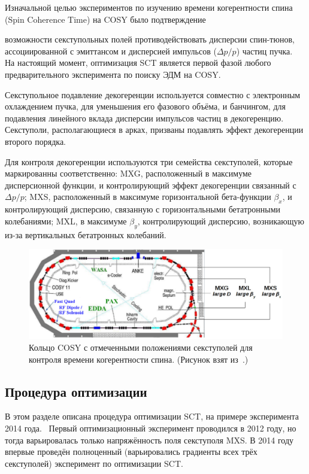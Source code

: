 \newcommand{\dpop}{\Delta p/p}

Изначальной целью экспериментов по изучению времени когерентности спина (Spin Coherence Time) на COSY было подтверждение

возможности секступольных полей противодействовать дисперсии спин-тюнов, ассоциированной с 
эмиттансом и дисперсией импульсов ($\dpop$) частиц пучка.~\cite{COSY:SCT:IPAC15} На настоящий момент, оптимизация SCT является первой фазой любого предварительного эксперимента по поиску ЭДМ на COSY.

Секступольное подавление декогеренции используется совместно с электронным охлаждением пучка, для
уменьшения его фазового объёма, и банчингом, для подавления линейного вклада дисперсии импульсов частиц 
в декогеренцию. Секступоли, располагающиеся в арках, призваны подавлять эффект декогеренции второго порядка.

Для контроля декогеренции используются три семейства секступолей, которые маркированны соответственно: MXG, расположенный в максимуме дисперсионной функции, и контролирующий эффект декогеренции связанный с $\dpop$; MXS, расположенный в максимуме горизонтальной бета-функции $\beta_x$, и контролирующий дисперсию, связанную с горизонтальными бетатронными колебаниями; MXL, в максимуме $\beta_y$, контролирующий дисперсию, возникающую из-за вертикальных бетатронных колебаний.

\begin{figure}[h]\centering
	\includegraphics[width=\linewidth]{images/chapter4/COSY-sextupoles}
	\caption{Кольцо COSY с отмеченными положениями секступолей для контроля времени когерентности спина. (Рисунок взят из~\cite{Guidoboni:STORI14}.)}
\end{figure}

\subsection{Процедура оптимизации}
В этом разделе описана процедура оптимизации SCT, на примере эксперимента 2014 года.~\cite{Guidoboni:STORI14} Первый оптимизационный эксперимент проводился в 2012 году, но тогда варьировалась только напряжённость поля секступоля MXS. В 2014 году впервые проведён полноценный (варьировались градиенты всех трёх секступолей) эксперимент по оптимизации SCT. 

